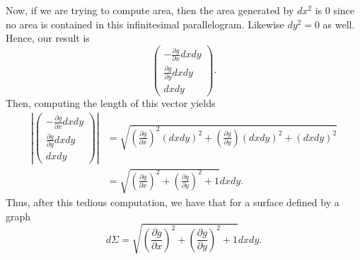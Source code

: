                                     Now, if we are trying to compute area, then the area generated by $dx^2$ is 0 since no area is contained in this infinitesimal parallelogram. Likewise $dy^2=0$ as well. Hence, our result is
                                    \[
                                    \begin{pmatrix} -\frac{\partial g}{\partial x} dxdy \\ \frac{\partial g}{\partial y} dxdy \\ dxdy \end{pmatrix}.
                                    \]
                                    Then, computing the length of this vector yields
                                     \begin{align*}
                                     \left| \begin{pmatrix} -\frac{\partial g}{\partial x} dxdy \\ \frac{\partial g}{\partial y} dxdy \\ dxdy \end{pmatrix}\right| &= \sqrt{ \left( \frac{\partial g}{\partial x}  \right)^2 (dxdy)^2 + \left( \frac{\partial g}{\partial y} \right) (dxdy)^2 + (dxdy)^2}\\
                                     &= \sqrt{\left(\frac{\partial g}{\partial x} \right)^2 + \left( \frac{\partial g}{\partial y}  \right)^2 +1 } dxdy.
                					\end{align*}
                					Thus, after this tedious computation, we have that for a surface defined by a graph
                					\[
                					d\Sigma = \sqrt{\left(\frac{\partial g}{\partial x} \right)^2 + \left( \frac{\partial g}{\partial y}  \right)^2 +1 } dxdy.
                					\]

